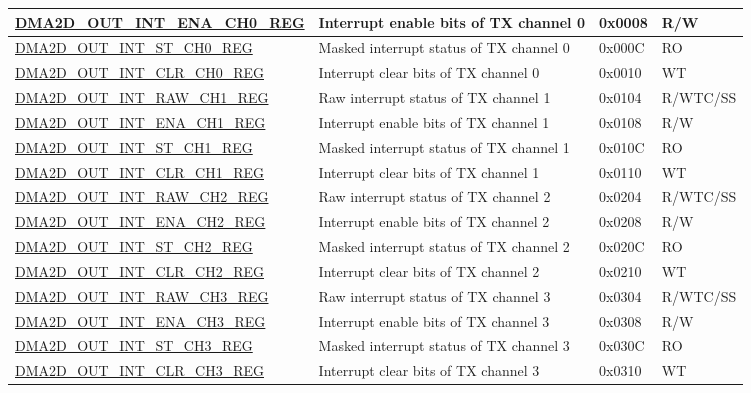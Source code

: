 \begin{longtable}{ | p{7cm} | p{11.5cm} | p{1.3cm} | p{2cm} | }
\hyperref[regdesc:DMA2DOUTINTENACHNREG]{DMA2D\_OUT\_INT\_ENA\_CH0\_REG} & Interrupt enable bits of TX channel 0 & 0x0008 & R/W \\ \hline
\hyperref[regdesc:DMA2DOUTINTSTCHNREG]{DMA2D\_OUT\_INT\_ST\_CH0\_REG} & Masked interrupt status of TX channel 0 & 0x000C & RO \\ \hline
\hyperref[regdesc:DMA2DOUTINTCLRCHNREG]{DMA2D\_OUT\_INT\_CLR\_CH0\_REG} & Interrupt clear bits of TX channel 0 & 0x0010 & WT \\ \hline
\hyperref[regdesc:DMA2DOUTINTRAWCHNREG]{DMA2D\_OUT\_INT\_RAW\_CH1\_REG} & Raw interrupt status of TX channel 1 & 0x0104 & R/WTC/SS \\ \hline
\hyperref[regdesc:DMA2DOUTINTENACHNREG]{DMA2D\_OUT\_INT\_ENA\_CH1\_REG} & Interrupt enable bits of TX channel 1 & 0x0108 & R/W \\ \hline
\hyperref[regdesc:DMA2DOUTINTSTCHNREG]{DMA2D\_OUT\_INT\_ST\_CH1\_REG} & Masked interrupt status of TX channel 1 & 0x010C & RO \\ \hline
\hyperref[regdesc:DMA2DOUTINTCLRCHNREG]{DMA2D\_OUT\_INT\_CLR\_CH1\_REG} & Interrupt clear bits of TX channel 1 & 0x0110 & WT \\ \hline
\hyperref[regdesc:DMA2DOUTINTRAWCHNREG]{DMA2D\_OUT\_INT\_RAW\_CH2\_REG} & Raw interrupt status of TX channel 2 & 0x0204 & R/WTC/SS \\ \hline
\hyperref[regdesc:DMA2DOUTINTENACHNREG]{DMA2D\_OUT\_INT\_ENA\_CH2\_REG} & Interrupt enable bits of TX channel 2 & 0x0208 & R/W \\ \hline
\hyperref[regdesc:DMA2DOUTINTSTCHNREG]{DMA2D\_OUT\_INT\_ST\_CH2\_REG} & Masked interrupt status of TX channel 2 & 0x020C & RO \\ \hline
\hyperref[regdesc:DMA2DOUTINTCLRCHNREG]{DMA2D\_OUT\_INT\_CLR\_CH2\_REG} & Interrupt clear bits of TX channel 2 & 0x0210 & WT \\ \hline
\hyperref[regdesc:DMA2DOUTINTRAWCHNREG]{DMA2D\_OUT\_INT\_RAW\_CH3\_REG} & Raw interrupt status of TX channel 3 & 0x0304 & R/WTC/SS \\ \hline
\hyperref[regdesc:DMA2DOUTINTENACHNREG]{DMA2D\_OUT\_INT\_ENA\_CH3\_REG} & Interrupt enable bits of TX channel 3 & 0x0308 & R/W \\ \hline
\hyperref[regdesc:DMA2DOUTINTSTCHNREG]{DMA2D\_OUT\_INT\_ST\_CH3\_REG} & Masked interrupt status of TX channel 3 & 0x030C & RO \\ \hline
\hyperref[regdesc:DMA2DOUTINTCLRCHNREG]{DMA2D\_OUT\_INT\_CLR\_CH3\_REG} & Interrupt clear bits of TX channel 3 & 0x0310 & WT \\ \hline

\end{longtable}
